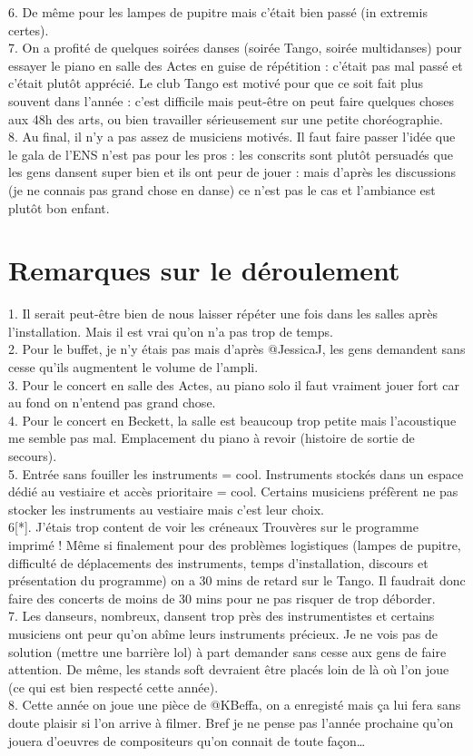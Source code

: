 \documentclass[a4paper,11pt]{article}
\begin{document}
{6. De même pour les lampes de pupitre mais c'était bien passé (in extremis certes).\\
7. On a profité de quelques soirées danses (soirée Tango, soirée multidanses) pour essayer le piano en salle des Actes en guise de répétition : c'était pas mal passé et c'était plutôt apprécié. Le club Tango est motivé pour que ce soit fait plus souvent dans l'année : c'est difficile mais peut-être on peut faire quelques choses aux 48h des arts, ou bien travailler sérieusement sur une petite choréographie.\\
8. Au final, il n'y a pas assez de musiciens motivés. Il faut faire passer l'idée que le gala de l'ENS n'est pas pour les pros : les conscrits sont plutôt persuadés que les gens dansent super bien et ils ont peur de jouer : mais d'après les discussions (je ne connais pas grand chose en danse) ce n'est pas le cas et l'ambiance est plutôt bon enfant.

\section{Remarques sur le déroulement}
1. Il serait peut-être bien de nous laisser répéter une fois dans les salles après l'installation. Mais il est vrai qu'on n'a pas trop de temps.\\
2. Pour le buffet, je n'y étais pas mais d'après @JessicaJ, les gens demandent sans cesse qu'ils augmentent le volume de l'ampli.\\
3. Pour le concert en salle des Actes, au piano solo il faut vraiment jouer fort car au fond on n'entend pas grand chose.\\
4. Pour le concert en Beckett, la salle est beaucoup trop petite mais l'acoustique me semble pas mal. Emplacement du piano à revoir (histoire de sortie de secours).\\
5. Entrée sans fouiller les instruments = cool. Instruments stockés dans un espace dédié au vestiaire et accès prioritaire = cool. Certains musiciens préfèrent ne pas stocker les instruments au vestiaire mais c'est leur choix.\\
6[*]. J'étais trop content de voir les créneaux Trouvères sur le programme imprimé ! Même si finalement pour des problèmes logistiques (lampes de pupitre, difficulté de déplacements des instruments, temps d'installation, discours et présentation du programme) on a 30 mins de retard sur le Tango. Il faudrait donc faire des concerts de moins de 30 mins pour ne pas risquer de trop déborder.\\
7. Les danseurs, nombreux, dansent trop près des instrumentistes et certains musiciens ont peur qu'on abîme leurs instruments précieux. Je ne vois pas de solution (mettre une barrière lol) à part demander sans cesse aux gens de faire attention. De même, les stands soft devraient être placés loin de là où l'on joue (ce qui est bien respecté cette année).\\
8. Cette année on joue une pièce de @KBeffa, on a enregisté mais ça lui fera sans doute plaisir si l'on arrive à filmer. Bref je ne pense pas l'année prochaine qu'on jouera d'oeuvres de compositeurs qu'on connait de toute façon\dots

}
\end{document}
